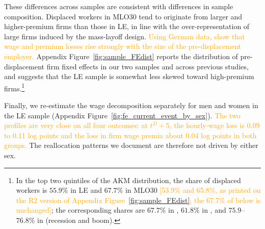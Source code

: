These differences across samples are consistent with differences in sample composition. Displaced workers in MLO30 tend to originate from larger and higher-premium firms than those in LE, in line with the over-representation of large firms induced by the mass-layoff design. \textcolor{orange}{Using German data, \citet{fackler2017explaining} show that wage and premium losses rise strongly with the size of the pre-displacement employer.} Appendix Figure~\ref{fig:sample_FEdist} reports the distribution of pre-displacement firm fixed effects in our two samples and across previous studies, and suggests that the LE sample is somewhat less skewed toward high-premium firms.\footnote{In the top two quintiles of the AKM distribution, the share of displaced workers is \(55.9\%\) in LE and \(67.7\%\) in MLO30 \textcolor{orange}{[53.9\% and 65.8\%, as printed on the R2 version of Appendix Figure~\ref{fig:sample_FEdist}; the 67.7\% of \citet{bertheau_etal_2023} below is unchanged]}; the corresponding shares are \(67.7\%\) in \citet{bertheau_etal_2023}, \(61.8\%\) in \citet{Lachowska2020}, and \(75.9\)--\(76.8\%\) in \citet{Schmieder2020} (recession and boom).}

Finally, we re-estimate the wage decomposition separately for men and women in the LE sample (Appendix Figure~\ref{fig:fe_current_event_by_sex}). \textcolor{orange}{The two profiles are very close on all four outcomes: at \(t^D+5\), the hourly-wage loss is 0.09 to 0.11 log points and the loss in firm wage premia about 0.04 log points in both groups.} The reallocation patterns we document are therefore not driven by either sex.

\FloatBarrier

